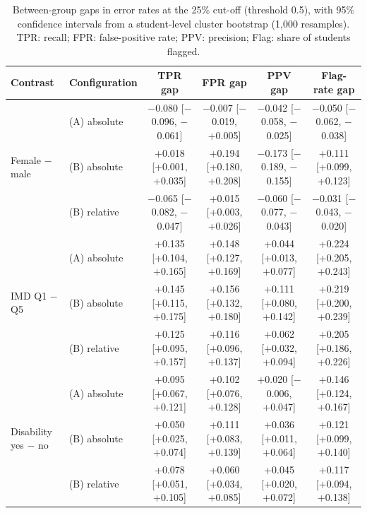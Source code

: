 \begin{table}[t]
\centering
\caption{Between-group gaps in error rates at the 25\% cut-off (threshold 0.5), with 95\% confidence intervals from a student-level cluster bootstrap (1{,}000 resamples). TPR: recall; FPR: false-positive rate; PPV: precision; Flag: share of students flagged.}
\label{tab:fairness}
\footnotesize
\setlength{\tabcolsep}{4pt}
\begin{tabular}{@{}llcccc@{}}
\toprule
Contrast & Configuration & TPR gap & FPR gap & PPV gap & Flag-rate gap \\
\midrule
\multirow{3}{*}{Female $-$ male} & (A) absolute & $-$0.080 [$-$0.096, $-$0.061] & $-$0.007 [$-$0.019, +0.005] & $-$0.042 [$-$0.058, $-$0.025] & $-$0.050 [$-$0.062, $-$0.038] \\
 & (B) absolute & +0.018 [+0.001, +0.035] & +0.194 [+0.180, +0.208] & $-$0.173 [$-$0.189, $-$0.155] & +0.111 [+0.099, +0.123] \\
 & (B) relative & $-$0.065 [$-$0.082, $-$0.047] & +0.015 [+0.003, +0.026] & $-$0.060 [$-$0.077, $-$0.043] & $-$0.031 [$-$0.043, $-$0.020] \\
\midrule
\multirow{3}{*}{IMD Q1 $-$ Q5} & (A) absolute & +0.135 [+0.104, +0.165] & +0.148 [+0.127, +0.169] & +0.044 [+0.013, +0.077] & +0.224 [+0.205, +0.243] \\
 & (B) absolute & +0.145 [+0.115, +0.175] & +0.156 [+0.132, +0.180] & +0.111 [+0.080, +0.142] & +0.219 [+0.200, +0.239] \\
 & (B) relative & +0.125 [+0.095, +0.157] & +0.116 [+0.096, +0.137] & +0.062 [+0.032, +0.094] & +0.205 [+0.186, +0.226] \\
\midrule
\multirow{3}{*}{Disability yes $-$ no} & (A) absolute & +0.095 [+0.067, +0.121] & +0.102 [+0.076, +0.128] & +0.020 [$-$0.006, +0.047] & +0.146 [+0.124, +0.167] \\
 & (B) absolute & +0.050 [+0.025, +0.074] & +0.111 [+0.083, +0.139] & +0.036 [+0.011, +0.064] & +0.121 [+0.099, +0.140] \\
 & (B) relative & +0.078 [+0.051, +0.105] & +0.060 [+0.034, +0.085] & +0.045 [+0.020, +0.072] & +0.117 [+0.094, +0.138] \\
\bottomrule
\end{tabular}
\end{table}
